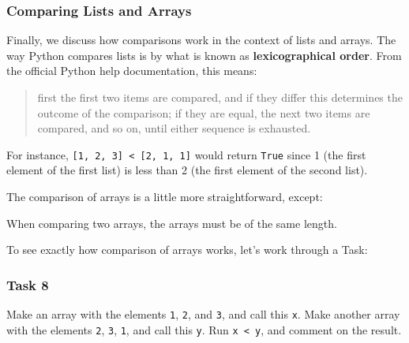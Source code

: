 \documentclass[
  11pt,
]{article}
\begin{document}
\subsubsection{Comparing Lists and
Arrays}\label{comparing-lists-and-arrays}

Finally, we discuss how comparisons work in the context of lists and
arrays. The way Python compares lists is by what is known as
\textbf{lexicographical order}. From the official Python help
documentation, this means:

\begin{quote}
first the first two items are compared, and if they differ this
determines the outcome of the comparison; if they are equal, the next
two items are compared, and so on, until either sequence is exhausted.
\end{quote}

For instance, \texttt{{[}1,\ 2,\ 3{]}\ \textless{}\ {[}2,\ 1,\ 1{]}}
would return \texttt{True} since 1 (the first element of the first list)
is less than 2 (the first element of the second list).

The comparison of arrays is a little more straightforward, except:

\begin{tcolorbox}[enhanced jigsaw, bottomrule=.15mm, colframe=quarto-callout-important-color-frame, coltitle=black, left=2mm, title=\textcolor{quarto-callout-important-color}{\faExclamation}\hspace{0.5em}{Important}, opacityback=0, opacitybacktitle=0.6, leftrule=.75mm, breakable, bottomtitle=1mm, toprule=.15mm, rightrule=.15mm, arc=.35mm, titlerule=0mm, colback=white, toptitle=1mm, colbacktitle=quarto-callout-important-color!10!white]

When comparing two arrays, the arrays must be of the same length.

\end{tcolorbox}

To see exactly how comparison of arrays works, let's work through a
Task:

\subsubsection{Task 8}\label{task-8}

Make an array with the elements \texttt{1}, \texttt{2}, and \texttt{3},
and call this \texttt{x}. Make another array with the elements
\texttt{2}, \texttt{3}, \texttt{1}, and call this \texttt{y}. Run
\texttt{x\ \textless{}\ y}, and comment on the result.
\end{document}
